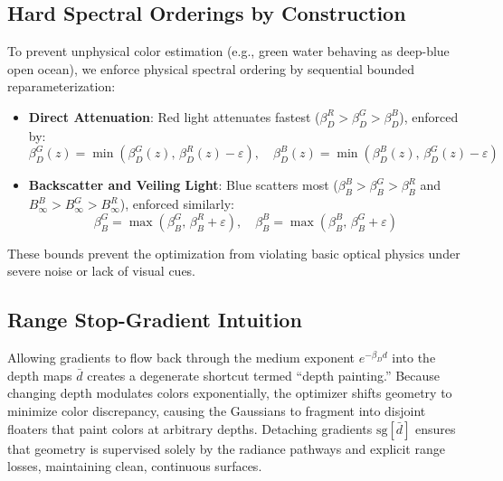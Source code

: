 \documentclass[11pt,a4paper]{article}
\begin{document}
\subsection{Hard Spectral Orderings by Construction}
To prevent unphysical color estimation (e.g., green water behaving as deep-blue open ocean), we enforce physical spectral ordering by sequential bounded reparameterization:
\begin{itemize}
    \item \textbf{Direct Attenuation}: Red light attenuates fastest ($\beta_D^R > \beta_D^G > \beta_D^B$), enforced by:
    \begin{equation}
        \beta_D^G(z) = \min\left(\beta_D^G(z),\, \beta_D^R(z) - \varepsilon\right), \quad \beta_D^B(z) = \min\left(\beta_D^B(z),\, \beta_D^G(z) - \varepsilon\right)
    \end{equation}
    \item \textbf{Backscatter and Veiling Light}: Blue scatters most ($\beta_B^B > \beta_B^G > \beta_B^R$ and $B_{\infty}^B > B_{\infty}^G > B_{\infty}^R$), enforced similarly:
    \begin{equation}
        \beta_B^G = \max\left(\beta_B^G,\, \beta_B^R + \varepsilon\right), \quad \beta_B^B = \max\left(\beta_B^B,\, \beta_B^G + \varepsilon\right)
    \end{equation}
\end{itemize}
These bounds prevent the optimization from violating basic optical physics under severe noise or lack of visual cues.

\subsection{Range Stop-Gradient Intuition}
Allowing gradients to flow back through the medium exponent $e^{-\beta_D d}$ into the depth maps $\bar{d}$ creates a degenerate shortcut termed ``depth painting.'' Because changing depth modulates colors exponentially, the optimizer shifts geometry to minimize color discrepancy, causing the Gaussians to fragment into disjoint floaters that paint colors at arbitrary depths. Detaching gradients $\text{sg}[\bar{d}]$ ensures that geometry is supervised solely by the radiance pathways and explicit range losses, maintaining clean, continuous surfaces.
\end{document}
